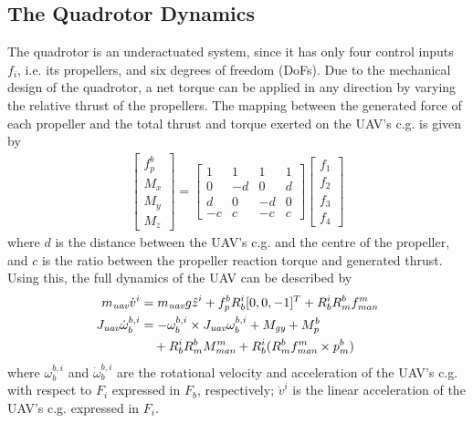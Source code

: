 \documentclass[a4paper, 10pt, conference]{ieeeconf}
\renewcommand{\cdot}{}  %
\begin{document}
\subsection{The Quadrotor Dynamics}
The quadrotor is an underactuated system, since it has only four
control inputs $f_i$, i.e. its propellers, and six degrees of freedom
(DoFs). Due to the mechanical design of the quadrotor, a net torque can
be applied in any direction by varying the relative thrust of the
propellers. The mapping between the generated force of each propeller
and the total thrust and torque exerted on the UAV's c.g. is given by
\begin{align*}
\left[
\begin{array}{c}
f_p^b\\
M_x\\
M_y\\
M_z
\end{array}
\right] = \left[
\begin{array}{cccc}
1 & 1 & 1 & 1 \\
0 & -d & 0 & d \\
d & 0 & -d & 0 \\
-c & c & -c & c
\end{array}
\right] \cdot \left[
\begin{array}{c}
f_1 \\
f_2 \\
f_3 \\
f_4
\end{array}
\right]
\end{align*}
where $d$ is the distance between the UAV's c.g. and the centre of the
propeller, and $c$ is the ratio between the propeller reaction torque
and generated thrust. Using this, the full dynamics of the UAV can be
described by
\begin{align}
m_\textit{uav} \cdot \dot{v}^i &= m_\textit{uav} \cdot g \cdot
\hat{z}^i + f_p^b \cdot R_b^i \cdot [0,0,-1]^T\notag + R_b^i \cdot R_m^b \cdot f_\textit{man}^m\notag\\
J_\textit{uav} \cdot \dot{\omega}_b^{b,i} &= -\omega_b^{b,i} \times
J_\textit{uav} \cdot \omega_b^{b,i} + M_\textit{gy} + M_p^b\notag\\
~&\quad+ R_b^i \cdot R_m^b \cdot M_\textit{man}^m + R_b^i (R_m^b \cdot f_\textit{man}^m \times p_m^b)
\label{eq:quad}
\end{align}
where $\omega_b^{b,i}$ and $\dot{\omega}_b^{b,i}$ are the rotational
velocity and acceleration of the UAV's c.g. with respect to $F_i$ expressed
in $F_b$, respectively; $\dot{v}^i$ is the linear acceleration of the
UAV's c.g. expressed in $F_i$.
\end{document}
